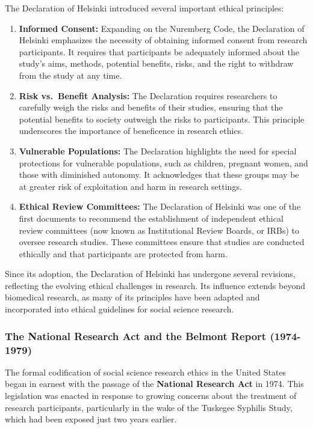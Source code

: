 \documentclass[
]{book}
\begin{document}
The Declaration of Helsinki introduced several important ethical principles:

\begin{enumerate}
\def\labelenumi{\arabic{enumi}.}
\item
  \textbf{Informed Consent:} Expanding on the Nuremberg Code, the Declaration of Helsinki emphasizes the necessity of obtaining informed consent from research participants. It requires that participants be adequately informed about the study's aims, methods, potential benefits, risks, and the right to withdraw from the study at any time.
\item
  \textbf{Risk vs.~Benefit Analysis:} The Declaration requires researchers to carefully weigh the risks and benefits of their studies, ensuring that the potential benefits to society outweigh the risks to participants. This principle underscores the importance of beneficence in research ethics.
\item
  \textbf{Vulnerable Populations:} The Declaration highlights the need for special protections for vulnerable populations, such as children, pregnant women, and those with diminished autonomy. It acknowledges that these groups may be at greater risk of exploitation and harm in research settings.
\item
  \textbf{Ethical Review Committees:} The Declaration of Helsinki was one of the first documents to recommend the establishment of independent ethical review committees (now known as Institutional Review Boards, or IRBs) to oversee research studies. These committees ensure that studies are conducted ethically and that participants are protected from harm.
\end{enumerate}

Since its adoption, the Declaration of Helsinki has undergone several revisions, reflecting the evolving ethical challenges in research. Its influence extends beyond biomedical research, as many of its principles have been adapted and incorporated into ethical guidelines for social science research.

\subsubsection*{The National Research Act and the Belmont Report (1974-1979)}\label{the-national-research-act-and-the-belmont-report-1974-1979}

The formal codification of social science research ethics in the United States began in earnest with the passage of the \textbf{National Research Act} in 1974. This legislation was enacted in response to growing concerns about the treatment of research participants, particularly in the wake of the Tuskegee Syphilis Study, which had been exposed just two years earlier.
\end{document}
